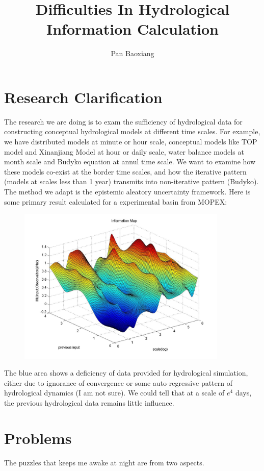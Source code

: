 \documentclass[11pt]{article}
\begin{document}
\title{Difficulties In Hydrological Information Calculation}
\date{ }
\author{Pan Baoxiang }
\maketitle

\section*{Research Clarification}
The research we are doing is to exam the sufficiency of hydrological data for constructing conceptual hydrological models at different time scales. For example, we have distributed models at minute or hour scale, conceptual models like TOP model and Xinanjiang Model at hour or daily scale, water balance models at month scale and Budyko equation at annul time scale. We want to examine how these models co-exist at the border time scales, and how  the iterative pattern (models at scales less than 1 year)  transmits into non-iterative pattern (Budyko). The method we adapt is the epistemic aleatory uncertainty framework. Here is some primary result calculated for a experimental basin from MOPEX:
\begin{figure}[htbp]
\centering
\includegraphics[width=10cm]{1.jpg}
\end{figure} 


The blue area shows a deficiency of data provided for hydrological simulation, either due to ignorance of convergence or some auto-regressive pattern of hydrological dynamics (I am not sure). We could tell that at a scale of $e^4$ days, the previous hydrological data remains little influence.

\section*{Problems}
The puzzles that keeps me awake at night are from two aspects. 
\end{document}

